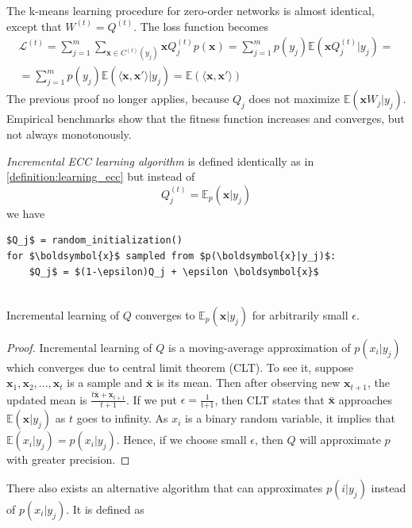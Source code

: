 \documentclass[oneside,english,logo]{amuthesis}
\begin{document}
The k-means learning procedure for zero-order networks is almost identical, except that $W^{(t)}=Q^{(t)}$. The loss function becomes
\begin{gather*}
\mathcal{L}^{(t)} = \sum_{j=1}^m \sum_{\boldsymbol{x}\in C^{(t)}(y_j)} \boldsymbol{x} Q_j^{(t)} p(\boldsymbol{x}) = \sum_{j=1}^m p(y_j) \mathbb{E}(\boldsymbol{x} Q_j^{(t)}|y_j) = \\ 
= \sum_{j=1}^m p(y_j) \mathbb{E}(\langle \boldsymbol{x},\boldsymbol{x}' \rangle |y_j) 	 = \mathbb{E}(\langle \boldsymbol{x},\boldsymbol{x}' \rangle)
\end{gather*}
The previous proof no longer applies, because $Q_j$ does not maximize $\mathbb{E}(\boldsymbol{x}W_j|y_j)$. Empirical benchmarks show that the fitness function increases and converges, but not always monotonously. 
\begin{definition}
	\label{definition:incremental_learning_ecc}
\textit{Incremental ECC learning algorithm} is defined identically as in \ref{definition:learning_ecc} but instead of
\[
Q^{(t)}_j = \mathbb{E}_p(\boldsymbol{x}|y_j)
\]
we have
\begin{lstlisting}
$Q_j$ = random_initialization()
for $\boldsymbol{x}$ sampled from $p(\boldsymbol{x}|y_j)$:
    $Q_j$ = $(1-\epsilon)Q_j + \epsilon \boldsymbol{x}$ 
    
\end{lstlisting}
\end{definition}
\begin{theorem}
Incremental learning of $Q$ converges to $\mathbb{E}_p(\boldsymbol{x}|y_j)$ for arbitrarily small $\epsilon$.
\end{theorem}
\begin{proof}
Incremental learning of $Q$ is a moving-average approximation of $p(x_i|y_j)$ which converges due to central limit theorem (CLT). To see it, suppose $\boldsymbol{x}_1,\boldsymbol{x}_2,...,\boldsymbol{x}_t$ is a sample and $\bar{\boldsymbol{x}}$ is its mean. Then after observing new $\boldsymbol{x}_{t+1}$, the updated mean is $\frac{t\bar{\boldsymbol{x}} + \boldsymbol{x}_{t+1} }{t+1}$. If we put $\epsilon=\frac{1}{\text{t+1}}$, then CLT states that $\bar{\boldsymbol{x}}$ approaches $\mathbb{E}(\boldsymbol{x}|y_j)$ as $t$ goes to infinity. As $x_i$ is a binary random variable, it implies that $\mathbb{E}(x_i|y_j)=p(x_i|y_j)$. Hence, if we choose small $\epsilon$, then $Q$ will approximate $p$ with greater precision.
\end{proof}
\iffalse
There also exists an alternative algorithm that can approximates $p(i|y_j)$ instead of $p(x_i|y_j)$. It is defined as
\end{document}
